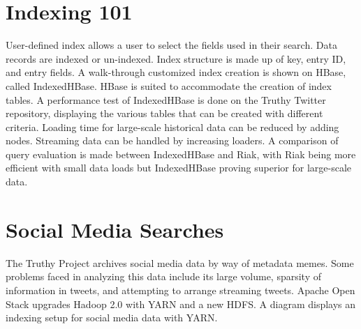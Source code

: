 


\section{Indexing 101}

User-defined index allows a user to select the fields used in their
search. Data records are indexed or un-indexed. Index structure is made
up of key, entry ID, and entry fields. A walk-through customized index
creation is shown on HBase, called IndexedHBase. HBase is suited to
accommodate the creation of index tables. A performance test of
IndexedHBase is done on the Truthy Twitter repository, displaying the
various tables that can be created with different criteria. Loading time
for large-scale historical data can be reduced by adding nodes.
Streaming data can be handled by increasing loaders. A comparison of
query evaluation is made between IndexedHBase and Riak, with Riak being
more efficient with small data loads but IndexedHBase proving superior
for large-scale data.




\section{Social Media Searches}

The Truthy Project archives social media data by way of metadata memes.
Some problems faced in analyzing this data include its large volume,
sparsity of information in tweets, and attempting to arrange streaming
tweets. Apache Open Stack upgrades Hadoop 2.0 with YARN and a new HDFS.
A diagram displays an indexing setup for social media data with YARN.


